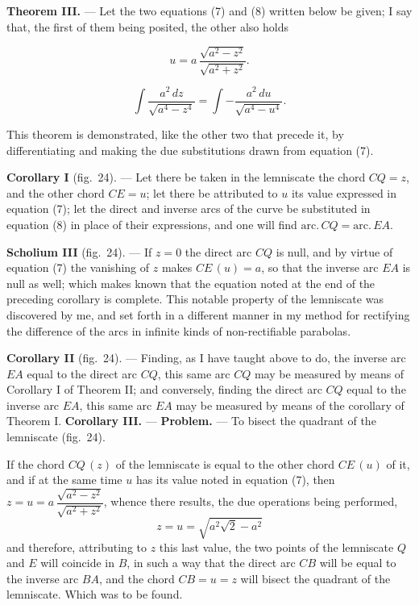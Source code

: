\documentclass{article}
\begin{document}
\textbf{Theorem III.} --- Let the two equations (7) and (8) written below be given; I say that,
the first of them being posited, the other also holds

\[ u = a\, \frac{\sqrt{a^{2} - z^{2}}}{\sqrt{a^{2} + z^{2}}}. \tag{7} \]

\[ \int \frac{a^{2}\,dz}{\sqrt{a^{4} - z^{4}}} = \int -\frac{a^{2}\,du}{\sqrt{a^{4} - u^{4}}}. \tag{8} \]

This theorem is demonstrated, like the other two that precede it, by differentiating and making
the due substitutions drawn from equation (7).

\textbf{Corollary I} (fig.~24). --- Let there be taken in the lemniscate the chord $CQ = z$, and
the other chord $CE = u$; let there be attributed to $u$ its value expressed in equation (7);
let the direct and inverse arcs of the curve be substituted in equation (8) in place of their
expressions, and one will find $\mathrm{arc.}\,CQ = \mathrm{arc.}\,EA$.

\textbf{Scholium III} (fig.~24). --- If $z = 0$ the direct arc $CQ$ is null, and by virtue of
equation (7) the vanishing of $z$ makes $CE\,(u) = a$, so that the inverse arc $EA$ is null as
well; which makes known that the equation noted at the end of the preceding corollary is
complete. This notable property of the lemniscate was discovered by me, and set forth in a
different manner in my method for rectifying the difference of the arcs in infinite kinds of
non-rectifiable parabolas.

\textbf{Corollary II} (fig.~24). --- Finding, as I have taught above to do, the inverse arc $EA$
equal to the direct arc $CQ$, this same arc $CQ$ may be measured by means of Corollary I of
Theorem II; and conversely, finding the direct arc $CQ$ equal to the inverse arc $EA$, this same
arc $EA$ may be measured by means of the corollary of Theorem I.
\textbf{Corollary III.} --- \textbf{Problem.} --- To bisect the quadrant of the lemniscate
(fig.~24).

If the chord $CQ\,(z)$ of the lemniscate is equal to the other chord $CE\,(u)$ of it, and if at
the same time $u$ has its value noted in equation (7), then
$z = u = a\, \dfrac{\sqrt{a^{2} - z^{2}}}{\sqrt{a^{2} + z^{2}}}$, whence there results, the due
operations being performed,
\[ z = u = \sqrt{a^{2}\sqrt{2} - a^{2}} \]
and therefore, attributing to $z$ this last value, the two points of the lemniscate $Q$ and $E$
will coincide in $B$, in such a way that the direct arc $CB$ will be equal to the inverse arc
$BA$, and the chord $CB = u = z$ will bisect the quadrant of the lemniscate. Which was to be
found.
\end{document}
